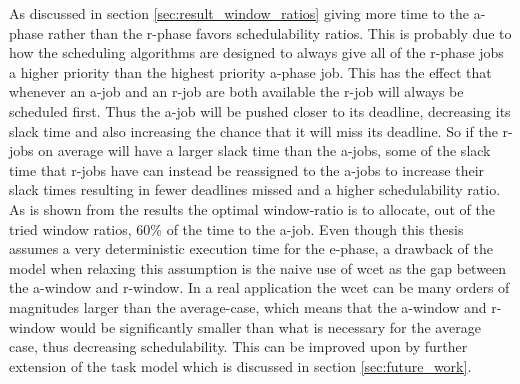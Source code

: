 \documentclass{kththesis}
\begin{document}
As discussed in section \ref{sec:result_window_ratios} giving more time to the \acrshort{a}-phase
rather than the \acrshort{r}-phase favors schedulability ratios. This is probably due to how the
scheduling algorithms are designed to always give all of the \acrshort{r}-phase jobs a higher
priority than the highest priority \acrshort{a}-phase job. This has the effect that whenever an
\acrshort{a}-job and an \acrshort{r}-job are both available the \acrshort{r}-job will always be
scheduled first. Thus the \acrshort{a}-job will be pushed closer to its deadline, decreasing its
slack time and also increasing the chance that it will miss its deadline. So if the
\acrshort{r}-jobs on average will have a larger slack time than the \acrshort{a}-jobs, some of the
slack time that \acrshort{r}-jobs have can instead be reassigned to the \acrshort{a}-jobs to
increase their slack times resulting in fewer deadlines missed and a higher schedulability ratio. As
is shown from the results the optimal window-ratio is to allocate, out of the tried window ratios,
60\% of the time to the \acrshort{a}-job. Even though this thesis assumes a very deterministic
execution time for the \acrshort{e}-phase, a drawback of the model when relaxing this assumption is
the naive use of \acrshort{wcet} as the gap between the \acrshort{a}-window and \acrshort{r}-window.
In a real application the \acrshort{wcet} can be many orders of magnitudes larger than the
average-case, which means that the \acrshort{a}-window and \acrshort{r}-window would be
significantly smaller than what is necessary for the average case, thus decreasing schedulability.
This can be improved upon by further extension of the task model which is discussed in section
\ref{sec:future_work}.

\end{document}
